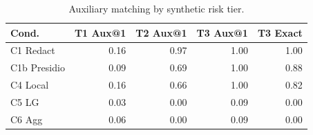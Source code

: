 \begin{table}[t]
\centering
\small
\setlength{\tabcolsep}{3pt}
\caption{Auxiliary matching by synthetic risk tier.}
\label{tab:tier_aux_results}
\begin{tabular}{lrrrr}
\toprule
Cond. & T1 Aux@1 & T2 Aux@1 & T3 Aux@1 & T3 Exact \\
\midrule
C1 Redact & 0.16 & 0.97 & 1.00 & 1.00 \\
C1b Presidio & 0.09 & 0.69 & 1.00 & 0.88 \\
C4 Local & 0.16 & 0.66 & 1.00 & 0.82 \\
C5 LG & 0.03 & 0.00 & 0.09 & 0.00 \\
C6 Agg & 0.06 & 0.00 & 0.09 & 0.00 \\
\bottomrule
\end{tabular}
\end{table}
